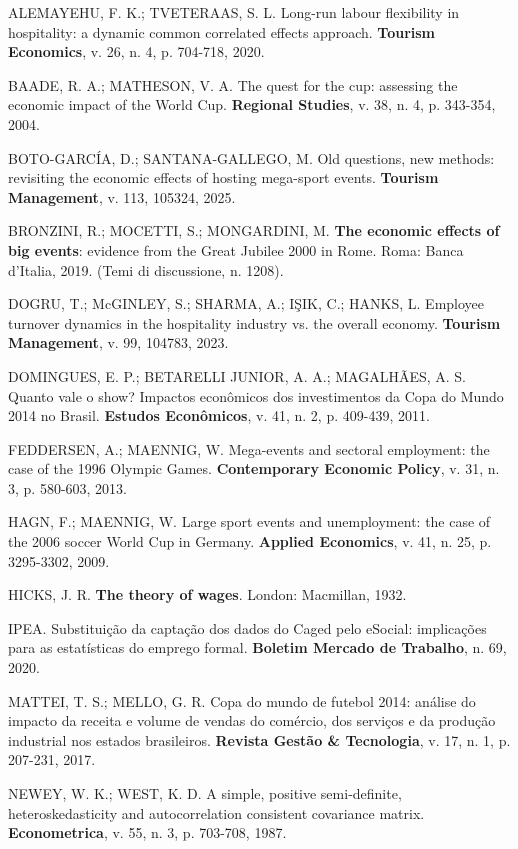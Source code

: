 \documentclass[11pt,a4paper]{article}
\begin{document}
\begin{small}\setlength{\parindent}{0pt}\setlength{\parskip}{4pt}\raggedright

ALEMAYEHU, F. K.; TVETERAAS, S. L. Long-run labour flexibility in hospitality: a dynamic common correlated effects approach. \textbf{Tourism Economics}, v. 26, n. 4, p. 704-718, 2020.

BAADE, R. A.; MATHESON, V. A. The quest for the cup: assessing the economic impact of the World Cup. \textbf{Regional Studies}, v. 38, n. 4, p. 343-354, 2004.

BOTO-GARCÍA, D.; SANTANA-GALLEGO, M. Old questions, new methods: revisiting the economic effects of hosting mega-sport events. \textbf{Tourism Management}, v. 113, 105324, 2025.

BRONZINI, R.; MOCETTI, S.; MONGARDINI, M. \textbf{The economic effects of big events}: evidence from the Great Jubilee 2000 in Rome. Roma: Banca d'Italia, 2019. (Temi di discussione, n. 1208).

DOGRU, T.; McGINLEY, S.; SHARMA, A.; IŞIK, C.; HANKS, L. Employee turnover dynamics in the hospitality industry vs. the overall economy. \textbf{Tourism Management}, v. 99, 104783, 2023.

DOMINGUES, E. P.; BETARELLI JUNIOR, A. A.; MAGALHÃES, A. S. Quanto vale o show? Impactos econômicos dos investimentos da Copa do Mundo 2014 no Brasil. \textbf{Estudos Econômicos}, v. 41, n. 2, p. 409-439, 2011.

FEDDERSEN, A.; MAENNIG, W. Mega-events and sectoral employment: the case of the 1996 Olympic Games. \textbf{Contemporary Economic Policy}, v. 31, n. 3, p. 580-603, 2013.

HAGN, F.; MAENNIG, W. Large sport events and unemployment: the case of the 2006 soccer World Cup in Germany. \textbf{Applied Economics}, v. 41, n. 25, p. 3295-3302, 2009.

HICKS, J. R. \textbf{The theory of wages}. London: Macmillan, 1932.

IPEA. Substituição da captação dos dados do Caged pelo eSocial: implicações para as estatísticas do emprego formal. \textbf{Boletim Mercado de Trabalho}, n. 69, 2020.

MATTEI, T. S.; MELLO, G. R. Copa do mundo de futebol 2014: análise do impacto da receita e volume de vendas do comércio, dos serviços e da produção industrial nos estados brasileiros. \textbf{Revista Gestão \& Tecnologia}, v. 17, n. 1, p. 207-231, 2017.

NEWEY, W. K.; WEST, K. D. A simple, positive semi-definite, heteroskedasticity and autocorrelation consistent covariance matrix. \textbf{Econometrica}, v. 55, n. 3, p. 703-708, 1987.
\end{small}
\end{document}
